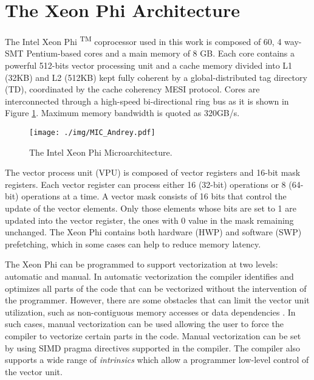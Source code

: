\documentclass{sig-alternate-05-2015}
\begin{document}
\section{The Xeon Phi Architecture}
\label{sec:mic}
The Intel \textsuperscript{\textregistered} Xeon Phi
\textsuperscript{TM} coprocessor used in this work is composed of 60,
4 way-SMT Pentium-based cores \cite{xeonphiBook2} and a main memory of
8 GB. Each core contains a powerful 512-bits vector processing unit
and a cache memory divided into L1 (32KB) and L2 (512KB) kept fully
coherent by a global-distributed tag directory (TD), coordinated by
the cache coherency MESI protocol. Cores are interconnected through a
high-speed bi-directional ring bus \cite{xeonphiBook2} as it is shown
in Figure \ref{fig:mic}. Maximum memory bandwidth is quoted as 320GB/s.






\begin{figure}
\centering
\texttt{[image: ./img/MIC\_Andrey.pdf]}\caption{The Intel \textsuperscript{\textregistered} Xeon Phi Microarchitecture.}
\label{fig:mic}
\vspace{-3mm}
\end{figure}

The vector process unit (VPU) is composed of vector registers and
16-bit mask registers. Each vector register can process either 16
(32-bit) operations or 8 (64-bit) operations at a time. A vector mask
consists of 16 bits that control the update of the vector
elements. Only those elements whose bits are set to 1 are updated into
the vector register, the ones with 0 value in the mask remaining
unchanged. The Xeon Phi contains both hardware (HWP) and software
(SWP) prefetching, which in some cases can help to reduce memory
latency.



The Xeon Phi can be programmed to support vectorization at two levels:
automatic and manual. In automatic vectorization the compiler
identifies and optimizes all parts of the code that can be vectorized
without the intervention of the programmer. However, there are some
obstacles that can limit the vector unit utilization, such as
non-contiguous memory accesses or data dependencies \cite{vecguide}
. In such cases, manual vectorization can be used allowing the user to
force the compiler to vectorize certain parts in the code. Manual
vectorization can be set by using SIMD pragma directives supported in
the compiler. The compiler also supports a wide range of {\em
  intrinsics} which allow a programmer low-level control of the vector
unit.
\end{document}
